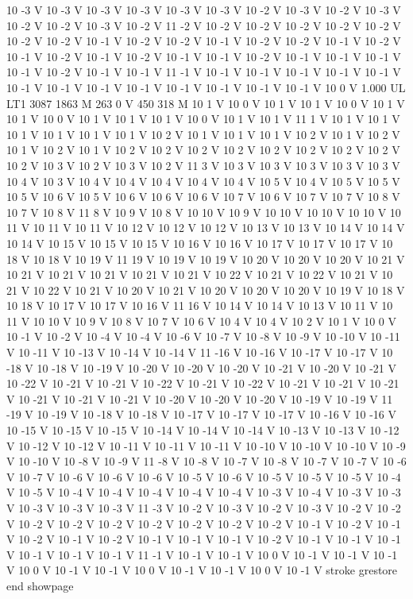 {{10 -3 V
10 -3 V
10 -3 V
10 -3 V
10 -3 V
10 -3 V
10 -2 V
10 -3 V
10 -2 V
10 -3 V
10 -2 V
10 -2 V
10 -3 V
10 -2 V
11 -2 V
10 -2 V
10 -2 V
10 -2 V
10 -2 V
10 -2 V
10 -2 V
10 -2 V
10 -1 V
10 -2 V
10 -2 V
10 -1 V
10 -2 V
10 -2 V
10 -1 V
10 -2 V
10 -1 V
10 -2 V
10 -1 V
10 -2 V
10 -1 V
10 -1 V
10 -2 V
10 -1 V
10 -1 V
10 -1 V
10 -1 V
10 -2 V
10 -1 V
10 -1 V
11 -1 V
10 -1 V
10 -1 V
10 -1 V
10 -1 V
10 -1 V
10 -1 V
10 -1 V
10 -1 V
10 -1 V
10 -1 V
10 -1 V
10 -1 V
10 -1 V
10 0 V
1.000 UL
LT1
3087 1863 M
263 0 V
450 318 M
10 1 V
10 0 V
10 1 V
10 1 V
10 0 V
10 1 V
10 1 V
10 0 V
10 1 V
10 1 V
10 1 V
10 0 V
10 1 V
10 1 V
11 1 V
10 1 V
10 1 V
10 1 V
10 1 V
10 1 V
10 1 V
10 2 V
10 1 V
10 1 V
10 1 V
10 2 V
10 1 V
10 2 V
10 1 V
10 2 V
10 1 V
10 2 V
10 2 V
10 2 V
10 2 V
10 2 V
10 2 V
10 2 V
10 2 V
10 2 V
10 3 V
10 2 V
10 3 V
10 2 V
11 3 V
10 3 V
10 3 V
10 3 V
10 3 V
10 3 V
10 4 V
10 3 V
10 4 V
10 4 V
10 4 V
10 4 V
10 4 V
10 5 V
10 4 V
10 5 V
10 5 V
10 5 V
10 6 V
10 5 V
10 6 V
10 6 V
10 6 V
10 7 V
10 6 V
10 7 V
10 7 V
10 8 V
10 7 V
10 8 V
11 8 V
10 9 V
10 8 V
10 10 V
10 9 V
10 10 V
10 10 V
10 10 V
10 11 V
10 11 V
10 11 V
10 12 V
10 12 V
10 12 V
10 13 V
10 13 V
10 14 V
10 14 V
10 14 V
10 15 V
10 15 V
10 15 V
10 16 V
10 16 V
10 17 V
10 17 V
10 17 V
10 18 V
10 18 V
10 19 V
11 19 V
10 19 V
10 19 V
10 20 V
10 20 V
10 20 V
10 21 V
10 21 V
10 21 V
10 21 V
10 21 V
10 21 V
10 22 V
10 21 V
10 22 V
10 21 V
10 21 V
10 22 V
10 21 V
10 20 V
10 21 V
10 20 V
10 20 V
10 20 V
10 19 V
10 18 V
10 18 V
10 17 V
10 17 V
10 16 V
11 16 V
10 14 V
10 14 V
10 13 V
10 11 V
10 11 V
10 10 V
10 9 V
10 8 V
10 7 V
10 6 V
10 4 V
10 4 V
10 2 V
10 1 V
10 0 V
10 -1 V
10 -2 V
10 -4 V
10 -4 V
10 -6 V
10 -7 V
10 -8 V
10 -9 V
10 -10 V
10 -11 V
10 -11 V
10 -13 V
10 -14 V
10 -14 V
11 -16 V
10 -16 V
10 -17 V
10 -17 V
10 -18 V
10 -18 V
10 -19 V
10 -20 V
10 -20 V
10 -20 V
10 -21 V
10 -20 V
10 -21 V
10 -22 V
10 -21 V
10 -21 V
10 -22 V
10 -21 V
10 -22 V
10 -21 V
10 -21 V
10 -21 V
10 -21 V
10 -21 V
10 -21 V
10 -20 V
10 -20 V
10 -20 V
10 -19 V
10 -19 V
11 -19 V
10 -19 V
10 -18 V
10 -18 V
10 -17 V
10 -17 V
10 -17 V
10 -16 V
10 -16 V
10 -15 V
10 -15 V
10 -15 V
10 -14 V
10 -14 V
10 -14 V
10 -13 V
10 -13 V
10 -12 V
10 -12 V
10 -12 V
10 -11 V
10 -11 V
10 -11 V
10 -10 V
10 -10 V
10 -10 V
10 -9 V
10 -10 V
10 -8 V
10 -9 V
11 -8 V
10 -8 V
10 -7 V
10 -8 V
10 -7 V
10 -7 V
10 -6 V
10 -7 V
10 -6 V
10 -6 V
10 -6 V
10 -5 V
10 -6 V
10 -5 V
10 -5 V
10 -5 V
10 -4 V
10 -5 V
10 -4 V
10 -4 V
10 -4 V
10 -4 V
10 -4 V
10 -3 V
10 -4 V
10 -3 V
10 -3 V
10 -3 V
10 -3 V
10 -3 V
11 -3 V
10 -2 V
10 -3 V
10 -2 V
10 -3 V
10 -2 V
10 -2 V
10 -2 V
10 -2 V
10 -2 V
10 -2 V
10 -2 V
10 -2 V
10 -2 V
10 -1 V
10 -2 V
10 -1 V
10 -2 V
10 -1 V
10 -2 V
10 -1 V
10 -1 V
10 -1 V
10 -2 V
10 -1 V
10 -1 V
10 -1 V
10 -1 V
10 -1 V
10 -1 V
11 -1 V
10 -1 V
10 -1 V
10 0 V
10 -1 V
10 -1 V
10 -1 V
10 0 V
10 -1 V
10 -1 V
10 0 V
10 -1 V
10 -1 V
10 0 V
10 -1 V
stroke
grestore
end
showpage
}}%
